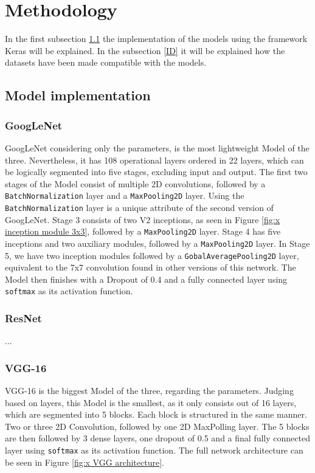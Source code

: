 \documentclass[conference]{IEEEtran}
\begin{document}
\section{Methodology}
In the first subsection \ref{IM} the implementation of the models using the framework Keras will be explained.
In the subsection \ref{ID} it will be explained how the datasets have been made compatible with the models.
\subsection{Model implementation}\label{IM}
\subsubsection{GoogLeNet}
GoogLeNet considering only the parameters, is the most lightweight Model of the three. Nevertheless, it has 108 operational layers ordered in 22 layers, which can be logically segmented into five stages, excluding input and output. 
The first two stages of the Model consist of multiple 2D convolutions, followed by a \verb|BatchNormalization| layer and a \verb|MaxPooling2D| layer. Using the \verb|BatchNormalization| layer is a unique attribute of the second version of GoogLeNet.
Stage 3 consists of two V2 inceptions, as seen in Figure \ref{fig:x inception module 3x3}, followed by a \verb|MaxPooling2D| layer.
Stage 4 has five inceptions and two auxiliary modules, followed by a \verb|MaxPooling2D| layer. 
In Stage 5, we have two inception modules followed by a \verb|GobalAveragePooling2D| layer, equivalent to the 7x7 convolution found in other versions of this network.
The Model then finishes with a Dropout of 0.4 and a fully connected layer using \verb|softmax| as its activation function.
\cite{szegedy_rethinking_2015}

\subsubsection{ResNet}
...

\subsubsection{VGG-16}
VGG-16 is the biggest Model of the three, regarding the parameters. 
Judging based on layers, this Model is the smallest, as it only consists out of 16 layers, which are segmented into 5 blocks. 
Each block is structured in the same manner. Two or three 2D Convolution, followed by one 2D MaxPolling layer. 
The 5 blocks are then followed by 3 dense layers, one dropout of 0.5 and a final  fully connected layer using \verb|softmax| as its activation function. 
The full network architecture can be seen in Figure \ref{fig:x VGG architecture}. \cite{simonyan_very_2015}
\end{document}
